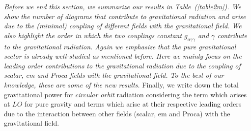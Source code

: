 \textit{Before we end this section, we summarize our results in Table~(\ref{table2m}). We show the number of diagrams that contribute to gravitational radiation and arise due to the (minimal) coupling of different fields with the gravitational field. We also highlight the order in which the two couplings constant $g_{a\gamma\gamma}$ and $\gamma$ contribute to the gravitational radiation. Again we emphasize that the pure gravitational sector is already well-studied \cite{Blanchet:2013haa} as mentioned before. Here we mainly focus on the leading order contributions to the gravitational radiation due to the coupling of scalar, em and Proca fields with the gravitational field. To the best of our knowledge, these are some of the new results.} 
Finally, we write down the total gravitational power for \textit{circular orbit} radiation considering the term which arises at $LO$  for pure gravity and terms which arise at their respective leading orders due to the interaction between other fields (scalar, em and Proca) with the gravitational field.
